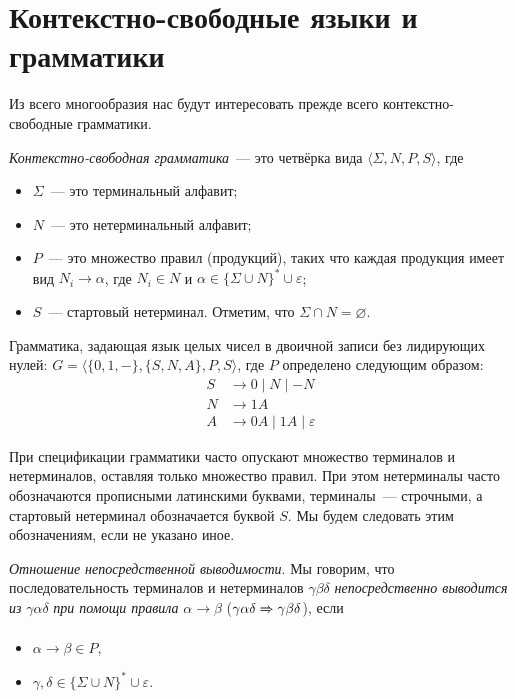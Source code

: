 \setchapterpreamble[u]{\margintoc}
\chapter{Контекстно-свободные языки и грамматики}
\label{CFG}

Из всего многообразия нас будут интересовать прежде всего контекстно-свободные грамматики.

\begin{definition}
    \emph{Контекстно-свободная грамматика}~--- это четвёрка вида $\langle \Sigma, N, P, S \rangle$, где
    \begin{itemize}
        \item $\Sigma$~--- это терминальный алфавит;
        \item $N$~--- это нетерминальный алфавит;
        \item $P$~--- это множество правил (продукций), таких что каждая продукция имеет вид $N_i \to \alpha$, где $N_i \in N$ и $\alpha \in \{\Sigma \cup N\}^* \cup {\varepsilon}$;
        \item $S$~--- стартовый нетерминал.
              Отметим, что $\Sigma \cap N = \varnothing$.
    \end{itemize}
\end{definition}

\begin{example}
    \label{ex:binary_cfg}
    Грамматика, задающая язык целых чисел в двоичной записи без лидирующих нулей: $G = \langle \{0, 1, -\}, \{S, N, A\}, P, S \rangle$, где $P$ определено следующим образом:
    \begin{align*}
        S & \rightarrow 0 \mid N \mid - N              \\
        N & \rightarrow 1 A                            \\
        A & \rightarrow 0 A \mid 1 A  \mid \varepsilon
    \end{align*}
\end{example}

При спецификации грамматики часто опускают множество терминалов и нетерминалов, оставляя только множество правил.
При этом нетерминалы часто обозначаются прописными латинскими буквами, терминалы~--- строчными, а стартовый нетерминал обозначается буквой $S$.
Мы будем следовать этим обозначениям, если не указано иное.

\begin{definition}
    \label{def derivability in CFG}
    \emph{Отношение непосредственной выводимости}. Мы говорим, что последовательность терминалов и нетерминалов $\gamma \beta \delta$ \emph{непосредственно выводится из} $\gamma \alpha \delta$ \emph{при помощи правила} $\alpha \rightarrow \beta$ ($\gamma \alpha \delta \xRightarrow[]{} \gamma \beta \delta$), если
    \begin{itemize}
        \item $\alpha \rightarrow \beta \in P$,
        \item $\gamma, \delta \in \{\Sigma \cup N\}^* \cup {\varepsilon}$.
    \end{itemize}
\end{definition}

